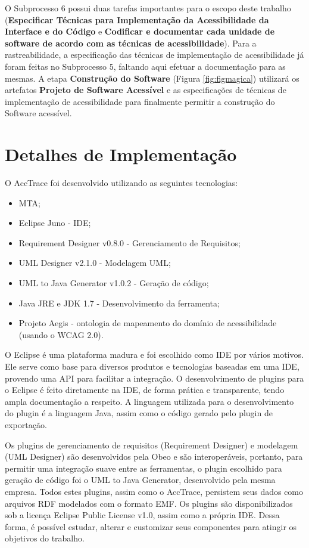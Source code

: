 \documentclass[runningheads,a4paper]{llncs}
\begin{document}
O Subprocesso 6 possui duas tarefas importantes para o escopo deste trabalho
(\textbf{Especificar Técnicas para Implementação da Acessibilidade da
Interface e do Código} e \textbf{Codificar e documentar cada unidade de software
de acordo com as técnicas de acessibilidade}). Para a rastreabilidade, a
especificação das técnicas de implementação de acessibilidade já foram feitas no
Subprocesso 5, faltando aqui efetuar a documentação para as mesmas. A etapa
\textbf{Construção do Software} (Figura \ref{fig:figmagica}) utilizará os
artefatos \textbf{Projeto de Software Acessível} e as especificações de técnicas
de implementação de acessibilidade para finalmente permitir a construção do
Software acessível.

\section{Detalhes de Implementação}

O AccTrace foi desenvolvido utilizando as seguintes tecnologias:

\begin{itemize}
  \item MTA;
  \item Eclipse Juno - IDE;
  \item Requirement Designer v0.8.0 - Gerenciamento de Requisitos;
  \item UML Designer v2.1.0 - Modelagem UML;
  \item UML to Java Generator v1.0.2 - Geração de código;
  \item Java JRE e JDK 1.7 - Desenvolvimento da ferramenta;
  \item Projeto Aegis - ontologia de mapeamento do domínio de acessibilidade (usando o WCAG 2.0).
\end{itemize}

O Eclipse é uma plataforma madura e foi escolhido como IDE por vários motivos. Ele
serve como base para diversos produtos e tecnologias baseadas em uma IDE, provendo
uma API para facilitar a integração. O desenvolvimento de plugins para o Eclipse é feito diretamente na IDE,
de forma prática e transparente, tendo ampla documentação a respeito. A linguagem
utilizada para o desenvolvimento do plugin é a linguagem Java, assim como o código
gerado pelo plugin de exportação.

Os plugins de gerenciamento de requisitos (Requirement Designer) e modelagem (UML Designer) são desenvolvidos pela Obeo e são interoperáveis, portanto, para permitir uma integração suave entre as ferramentas, o plugin escolhido para geração de código foi o UML to Java Generator, desenvolvido pela
mesma empresa. Todos estes plugins, assim como o AccTrace, persistem seus dados como arquivos RDF modelados com o formato EMF. Os plugins são disponibilizados sob a licença Eclipse Public License v1.0, assim como a própria IDE. Dessa forma, é possível estudar, alterar e customizar seus componentes para atingir os objetivos do trabalho.
\end{document}
